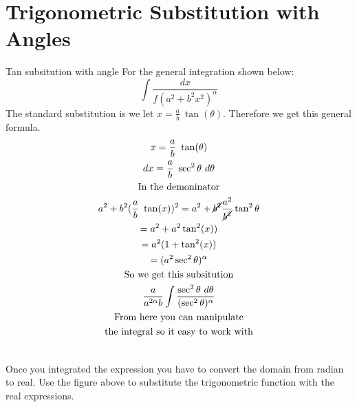 \documentclass[letterpaper,10pt,twoside,twocolumn,openany]{book}
\begin{document}
\section{Trigonometric Substitution with Angles}
\begin{paperbox}[]{Tan subsitution with angle}
    For the general integration shown below:
    \begin{equation}
        \int \frac{dx}{f(a^2+b^2x^2)^\alpha}
    \end{equation}
    The standard substitution is we let $x = \frac{a}{b}\ \tan(\theta)$. Therefore we get this general formula.
    \begin{gather*}
        x = \frac{a}{b}\ \tan(\theta)\\
        dx =  \frac{a}{b}\ \sec^2\theta\ d\theta\\
        \text{In the demoninator}\\
        a^2 + b^2(\frac{a}{b}\ \tan(x))^2 = a^2 + \cancel{b^2}\frac{a^2}{\cancel{b^2}}\tan^2\theta\\
        = a^2 + a^2 \tan^2(x))\\
        = a^2(1 + \tan^2(x))\\ 
        = (a^2 \sec^2\theta)^\alpha\\
        \text{So we get this subsitution}\\
        \frac{a}{a^{2\alpha}b} \int \frac{\sec^2\theta\ d\theta}{(\sec^2\theta)^\alpha}\\
        \text{From here you can manipulate}\\
        \text{the integral so it easy to work with}
    \end{gather*}
    \centering
    \\
    Once you integrated the expression you have to convert the domain from radian to real. Use the figure above to substitute the trigonometric function with the real expressions.
\end{paperbox}
\end{document}
